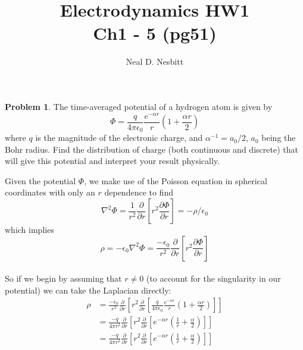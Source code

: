 \documentclass{article}
\title{Electrodynamics HW1\\
Ch1 - 5 (pg51)}
\author{Neal D. Nesbitt}
\begin{document}
\maketitle

\theoremstyle{definition}
\newtheorem{problem}{Problem}

\begin{problem}
	The time-averaged potential of a hydrogen atom is given by
	\[ \Phi = \frac{q}{4\pi\epsilon_{0}} \frac{e^{-\alpha r}}{r} \left( 1 + \frac{\alpha r}{2} \right) \]
	where $q$ is the magnitude of the electronic charge, and $\alpha^{-1}=a_{0}/2$, $a_{0}$ being the Bohr radius. Find the distribution of charge (both continuous and discrete) that will give this potential and interpret your result physically.	
\end{problem}

Given the potential $\Phi$, we make use of the Poisson equation in spherical coordinates with only an $r$ dependence to find
\[ \nabla^{2}\Phi = \frac{1}{r^{2}}\frac{\partial}{\partial r} \left[ r^{2} \frac{\partial\Phi}{\partial r}\right] = -\rho / \epsilon_{0} \]
which implies
\[ \rho = -\epsilon_{0} \nabla^{2}\Phi = \frac{-\epsilon_{0}}{r^{2}}\frac{\partial}{\partial r} \left[ r^{2} \frac{\partial\Phi}{\partial r}\right] \]
\\
So if we begin by assuming that $r\ne 0$ (to account for the singularity in our potential) we can take the Laplacian directly:
\begin{align*}
	\rho &= \frac{-\epsilon_{0}}{r^{2}}\frac{\partial}{\partial r} \left[ r^{2} \frac{\partial}{\partial r} \left[ \frac{q}{4\pi\epsilon_{0}} \frac{e^{-\alpha r}}{r} \left( 1 + \frac{\alpha r}{2} \right) \right] \right]\\
		&= \frac{-q}{4\pi r^{2}} \frac{\partial}{\partial r} \left[ r^{2} \frac{\partial}{\partial r} \left[ e^{-\alpha r} \left( \frac{1}{r} + \frac{\alpha}{2} \right) \right] \right]\\
		&= \frac{-q}{4\pi r^{2}} \frac{\partial}{\partial r} \left[ r^{2} \frac{\partial}{\partial r} \left[ e^{-\alpha r} \left( \frac{1}{r} + \frac{\alpha}{2} \right) \right] \right]\\
\end{align*}
\end{document}
